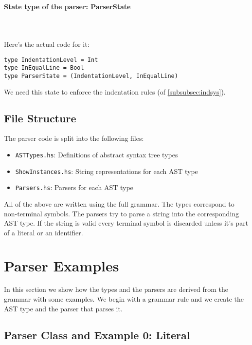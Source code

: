 \documentclass[diploma]{softlab-thesis}
\def\pend{\mbox{}\\\\}
\begin{document}
\paragraph{State type of the parser: ParserState}\pend
Here's the actual code for it:
\begin{verbatim}
type IndentationLevel = Int
type InEqualLine = Bool
type ParserState = (IndentationLevel, InEqualLine)
\end{verbatim}
We need this state to enforce the indentation rules (of
\ref{subsubsec:indsys}).

\subsection{File Structure}
The parser code is split into the following files:
\begin{itemize}
\item
\verb|ASTTypes.hs|: Definitions of abstract syntax tree types
\item
\verb|ShowInstances.hs|: String representations for each AST type
\item
\verb|Parsers.hs|: Parsers for each AST type
\end{itemize}
All of the above are written using the full grammar. The types correspond to
non-terminal symbols. The parsers try to parse a string into the corresponding
AST type. If the string is valid every terminal symbol is discarded unless it's
part of a literal or an identifier.

\section{Parser Examples}

In this section we show how the types and the parsers are derived from the
grammar with some examples. We begin with a grammar rule and we create the
AST type and the parser that parses it.

\subsection{Parser Class and Example 0: Literal}
\end{document}
